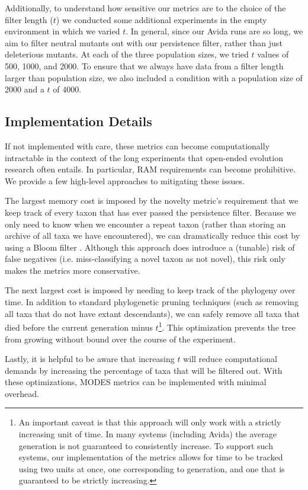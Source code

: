 \documentclass[letterpaper]{article}
\begin{document}
Additionally, to understand how sensitive our metrics are to the choice of the filter length ($t$) we conducted some additional experiments in the empty environment in which we varied $t$. In general, since our Avida runs are so long, we aim to filter neutral mutants out with our persistence filter, rather than just deleterious mutants. At each of the three population sizes, we tried $t$ values of 500, 1000, and 2000. To ensure that we always have data from a filter length larger than population size, we also included a condition with a population size of 2000 and a $t$ of 4000.

\subsection{Implementation Details}
If not implemented with care, these metrics can become computationally intractable in the context of the long experiments that open-ended evolution research often entails. In particular, RAM requirements can become prohibitive. We provide a few high-level approaches to mitigating these issues.

The largest memory cost is imposed by the novelty metric's requirement that we keep track of every taxon that has ever passed the persistence filter. Because we only need to know when we encounter a repeat taxon (rather than storing an archive of all taxa we have encountered), we can dramatically reduce this cost by using a Bloom filter \citep{bloom_space/time_1970}. Although this approach does introduce a (tunable) risk of false negatives (i.e. miss-classifying a novel taxon as not novel), this risk only makes the metrics more conservative. 

The next largest cost is imposed by needing to keep track of the phylogeny over time. In addition to standard phylogenetic pruning techniques (such as removing all taxa that do not have extant descendants), we can safely remove all taxa that died before the current generation minus $t$\footnote{An important caveat is that this approach will only work with a strictly increasing unit of time. In many systems (including Avida) the average generation is not guaranteed to consistently increase. To support such systems, our implementation of the metrics allows for time to be tracked using two units at once, one corresponding to generation, and one that is guaranteed to be strictly increasing.}. This optimization prevents the tree from growing without bound over the course of the experiment.

Lastly, it is helpful to be aware that increasing $t$ will reduce computational demands by increasing the percentage of taxa that will be filtered out. With these optimizations, MODES metrics can be implemented with minimal overhead.
\end{document}
